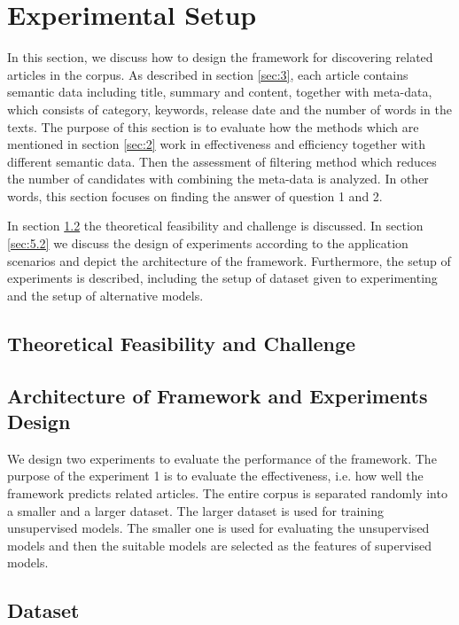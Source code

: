 \section{Experimental Setup}
\label{sec:5}
In this section, we discuss how to design the framework for discovering related articles in the corpus. As described in section \ref{sec:3}, each article contains semantic data including title, summary and content, together with meta-data, which consists of category, keywords, release date and the number of words in the texts. The purpose of this section is to evaluate how the methods which are mentioned in section \ref{sec:2} work in effectiveness and efficiency together with different semantic data. Then the assessment of filtering method which reduces the number of candidates with combining the meta-data is analyzed. In other words, this section focuses on finding the answer of question 1 and 2.

In section \ref{sec:5.1} the theoretical feasibility and challenge is discussed. In section \ref{sec:5.2} we discuss the design of experiments according to the application scenarios and depict the architecture of the framework. Furthermore, the setup of experiments is described, including the setup of dataset given to experimenting and the setup of alternative models. 

\subsection{Theoretical Feasibility and Challenge}



\subsection{Architecture of Framework and Experiments Design}
\label{sec:5.1}
We design two experiments to evaluate the performance of the framework. The purpose of the experiment 1 is to evaluate the effectiveness, i.e. how well the framework predicts related articles. The entire corpus is separated randomly into a smaller and a larger dataset. The larger dataset is used for training unsupervised models. The smaller one is used for evaluating the unsupervised models and then the suitable models are selected as the features of supervised models. 

\subsection{Dataset}

